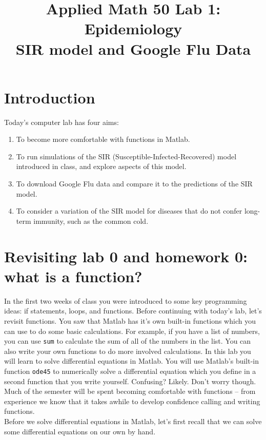 \documentclass[12pt]{amsart}
\title{Applied Math 50 Lab 1: Epidemiology\\
SIR model and Google Flu Data}
\date{}
\begin{document}
\maketitle

\section{Introduction}
Today's computer lab has four aims:
\begin{enumerate}
	\item To become more comfortable with  functions in Matlab.
	\item To run simulations of the SIR (Susceptible-Infected-Recovered) model introduced in class, and explore aspects of this model.
	\item To download Google Flu data and compare it to the predictions of the SIR model.
	\item To consider a variation of the SIR model for diseases that do not confer long-term immunity, such as the common cold.
\end{enumerate}

\section{Revisiting lab 0 and homework 0: what is a function?}

\noindent In the first two weeks of class you were introduced to some key programming ideas: if statements, loops, and functions.  Before continuing with today's lab, let's revisit functions.  You saw that Matlab has it's own built-in functions which you can use to do some basic calculations.  For example, if you have a list of numbers, you can use \verb+sum+ to calculate the sum of all of the numbers in the list.  You can also write your own functions to do more involved calculations.  In this lab you will learn to solve differential equations in Matlab. You will use Matlab's built-in function \verb+ode45+ to numerically solve a differential equation which you define in a second function that you write yourself.   Confusing?  Likely.  Don't worry though.  Much of the semester will be spent becoming comfortable with functions -- from experience we know that it takes awhile to develop confidence calling and writing functions.   \\

\noindent Before we solve differential equations in Matlab, let's first recall that we can solve some differential equations on our own by hand.\\
\end{document}

